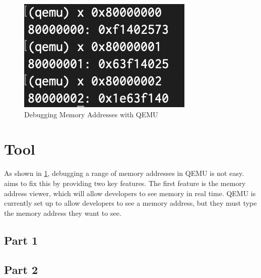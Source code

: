 
\begin{figure}[!t]
    \centering
    \vspace{-4pt}
    \includegraphics[scale=0.75]{figures/qemu.png}
    \vspace{-5pt}
    \caption {
        Debugging Memory Addresses with QEMU
    }
    \label{debug-memory-address-qemu}
\end{figure}

\section{Tool}

As shown in \ref{debug-memory-address-qemu}, debugging a range of memory addresses in QEMU is not easy.
%
\tool aims to fix this by providing two key features.
%
The first feature is the memory address viewer, which will allow developers to see memory in real time.
%
QEMU is currently set up to allow developers to see a memory address, but they must type the memory address they want to see.
%


\subsection{Part 1}

\subsection{Part 2}
